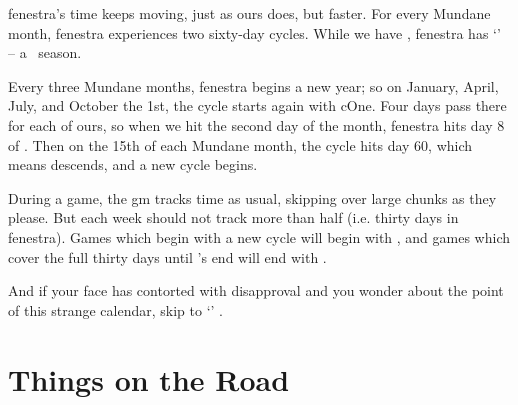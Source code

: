 \begin{multicols}{2}
\Gls{fenestra}'s time keeps moving, just as ours does, but faster.
For every Mundane month, \gls{fenestra} experiences two sixty-day \glspl{cycle}.
\setcounter{track}{\month}
\setCycle{\month}{\day}
While we have \trackMonth, \gls{fenestra} has `\showCycle' -- a \showTemperature\ season.

Every three Mundane months, \gls{fenestra} begins a new year; so on January, April, July, and October the 1st, the \gls{cycle} starts again with \gls{cOne}.
Four days pass there for each of ours, so when we hit the second day of the month, \gls{fenestra} hits day 8 of .
Then on the 15th of each Mundane month, the \gls{cycle} hits day 60, which means  descends, and a new \gls{cycle} begins.

During a game, the \gls{gm} tracks time as usual, skipping over large chunks as they please.
But each week should not track more than half  (i.e. thirty days in \gls{fenestra}).
Games which begin with a new \gls{cycle} will begin with , and games which cover the full thirty days until 's end will end with .

And if your face has contorted with disapproval and you wonder about the point of this strange calendar, skip to `' .

\end{multicols}

\section{Things on the Road}
\label{randomEncounters}

